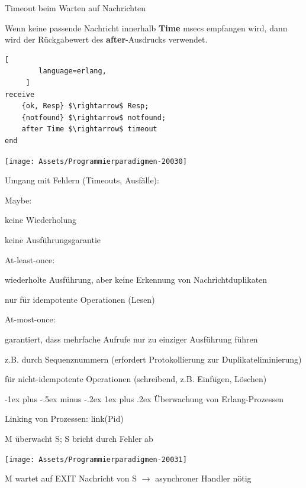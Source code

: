 \documentclass[10pt]{article}
\makeatletter
\renewcommand{\subsubsection}{\@startsection{subsubsection}{3}{0mm}%
                                {-1ex plus -.5ex minus -.2ex}%
                                {1ex plus .2ex}%
                                {\normalfont\small\bfseries}}
\makeatother
\begin{document}
  \begin{itemize*}
    \item Timeout beim Warten auf Nachrichten
    \item Wenn keine passende Nachricht innerhalb \textbf{Time} msecs empfangen wird, dann wird der Rückgabewert des \textbf{after}-Ausdrucks verwendet.
  \end{itemize*}
  \begin{lstlisting}[
        language=erlang,
     ]
receive
    {ok, Resp} $\rightarrow$ Resp;
    {notfound} $\rightarrow$ notfound;
    after Time $\rightarrow$ timeout
end
\end{lstlisting}
  \begin{center}
    \centering
    \texttt{[image: Assets/Programmierparadigmen-20030]}
    
    Umgang mit Fehlern (Timeouts, Ausfälle):
    \begin{itemize*}
      \item Maybe:
      \begin{itemize*}
        \item keine Wiederholung
        \item keine Ausführungsgarantie
      \end{itemize*}
      \item At-least-once:
      \begin{itemize*}
        \item wiederholte Ausführung, aber keine Erkennung von Nachrichtduplikaten
        \item nur für idempotente Operationen (Lesen)
      \end{itemize*}
      \item At-most-once:
      \begin{itemize*}
        \item garantiert, dass mehrfache Aufrufe nur zu einziger Ausführung führen
        \item z.B. durch Sequenznummern (erfordert Protokollierung zur Duplikateliminierung)
        \item für nicht-idempotente Operationen (schreibend, z.B. Einfügen, Löschen)
      \end{itemize*}
    \end{itemize*}
    
  \end{center}
  \subsubsection{Überwachung von Erlang-Prozessen}
  \begin{itemize*}
    \item Linking von Prozessen: \color{green}link\color{blue}(Pid) \color{black}
    \item M überwacht S; S bricht durch Fehler ab
    \begin{center}
      \centering
      \texttt{[image: Assets/Programmierparadigmen-20031]}
    \end{center}
    \item M wartet auf EXIT Nachricht von S $\rightarrow$ asynchroner Handler nötig
  \end{itemize*}
  
\end{document}
